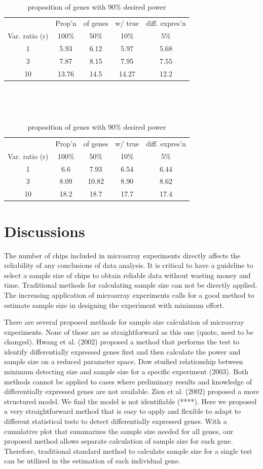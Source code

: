 \documentclass{bioinfo}
\begin{document}
\begin{table}\centering
\caption{proposition of genes with 80\% desired power}\
\begin{tabular}{ccccc} \hline
&Prop'n&of genes& w/ true & diff. expres'n\\
Var. ratio (r) & 100\% & 50\% & 10\% & 5\%\\
\hline
1 & 5.93 & 6.12 & 5.97 & 5.68\\
3 & 7.87 & 8.15 & 7.95 & 7.55\\
10 & 13.76 & 14.5 & 14.27 & 12.2\\
\hline
\end{tabular}
\label{tb:Guidea}
\\
\caption{proposition of genes with 90\% desired power}\
\begin{tabular}{ccccc} \hline
&Prop'n&of genes& w/ true & diff. expres'n\\
Var. ratio (r) & 100\% & 50\% & 10\% & 5\%\\
\hline
1 & 6.6 & 7.93 & 6.54 & 6.44\\
3 & 8.09 & 10.82 & 8.90 & 8.62\\
10 & 18.2 & 18.7 & 17.7 & 17.4\\
\hline
\end{tabular}
\label{tb:Guideb}
\end{table}




\section{Discussions}

The number of chips included in microarray experiments directly
affects the reliability of any conclusions of data analysis. It is
critical to have a guideline to select a sample size of chips to
obtain reliable data without wasting money and time. Traditional
methods for calculating sample size can not be directly applied.
The increasing application of microarray experiments calls for a
good method to estimate sample size in designing the experiment
with minimum effort.

There are several proposed methods for sample size calculation of
microarray experiments. None of those are as straightforward as
this one (quote, need to be changed). Hwang et al. (2002) proposed
a method that performs the test to identify differentially
expressed genes first and then calculate the power and sample size
on a reduced parameter space. Dow studied relationship between
minimum detecting size and sample size for a specific experiment
(2003). Both methods cannot be applied to cases where preliminary
results and knowledge of differentially expressed genes are not
available. Zien et al. (2002) proposed a more structured model. We
find the model is not identifiable (****). Here we proposed a very
straightforward method that is easy to apply and flexible to adapt
to different statistical tests to detect differentially expressed
genes. With a cumulative plot that summarizes the sample size
needed for all genes, our proposed method allows separate
calculation of sample size for each gene. Therefore, traditional
standard method to calculate sample size for a single test can be
utilized in the estimation of each individual gene.
\end{document}
